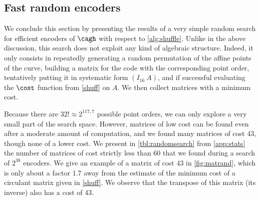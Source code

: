 \subsection{Fast random encoders}

We conclude this section by presenting the results of a very simple random search for efficient encoders of $\cagh$ with respect to \autoref{alg:shuffle}. Unlike
in the above discussion, this search does not exploit any kind of algebraic structure.
Indeed, it only consists in repeatedly generating a random permutation of the affine points of the curve, building
a matrix for the code with the corresponding point order, tentatively putting it in systematic form $(I_{16}~A)$, and if successful evaluating
the $\cost$ function from \autoref{shuff} on $A$. We then collect matrices with a minimum cost.

Because there are $32! \approx 2^{117,7}$ possible point orders, we can only explore a very small part of the search space. However,
matrices of low cost can be found even after a moderate amount of computation, and we found many matrices of
cost 43, though none of a lower cost. We present in \autoref{tbl:randomsearch} from \autoref{app:stats} the number of matrices of cost strictly less than 60
that we found during a search of $2^{38}$ encoders.
We give an example of a matrix of cost 43 in \autoref{fig:matrand}, which is only about a factor 1.7 away from the estimate of the minimum cost of a circulant matrix
given in \autoref{shuff}. We observe that the transpose of this matrix (its inverse) also has a cost of 43.
